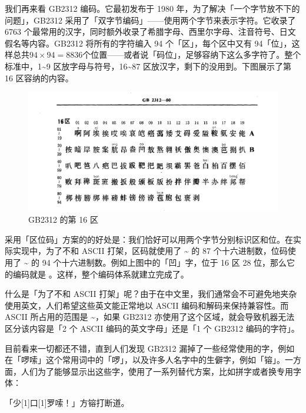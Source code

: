 我们再来看 GB2312 编码。它最初发布于 1980 年，为了解决「一个字节放不下的问题」，GB2312 采用了「双字节编码」——使用两个字节来表示字符。它收录了 6763 个最常用的汉字，同时额外收录了希腊字母、西里尔字母、注音符号、日文假名等内容。GB2312 将所有的字符编入 94 个「区」，每个区中又有 94「位」，这样总共$94 \times 94 = 8836$个位置——或者说「码位」，足够容纳下这么多字符了。整个标准中，1\textasciitilde9 区放字母与符号，16\textasciitilde87 区放汉字，剩下的没用到。下图展示了第 16 区容纳的内容。

\begin{figure}[htb!]
  \centering
  \includegraphics[width=.75\textwidth]{assets/advanced/GB2312.png}
  \caption{GB2312 的第 16 区}
  \label{fig:GB2312-block-16}
\end{figure}

采用「区位码」方案的的好处是：我们恰好可以用两个字节分别标识区和位。在实际实现中，为了不和 ASCII 打架，区码就使用了 \textasciitilde{} 的 87 个十六进制数，位码使用了 \textasciitilde{} 的 94 个十六进制数。例如上图中的「凹」字，位于 16 区 28 位，那么它的编码就是 。这样，整个编码体系就建立完成了。

\begin{note}
  什么是「为了不和 ASCII 打架」呢？由于在中文里，我们通常会不可避免地夹杂使用英文，人们希望这些英文能正常地以 ASCII 编码和解码来保持兼容性。而 ASCII 所占用的范围是 \textasciitilde{}，如果 GB2312 亦使用了这个区域，就会导致机器无法区分该内容是「2 个 ASCII 编码的英文字母」还是「1 个 GB2312 编码的字符」。
\end{note}

目前看来一切都还不错，直到人们发现 GB2312 漏掉了一些经常使用的字，例如在「啰嗦」这个常用词中的「啰」，以及许多人名字中的生僻字，例如「镕」。一方面，人们为了能够显示出这些字，使用了一系列替代方案，比如拼字或者换专用字体：

\begin{quoting}
  「少\scalebox{0.4}[1]{口}\scalebox{0.6}[1]{罗}嗦！」方{\SimSun 镕}打断道。
\end{quoting}

